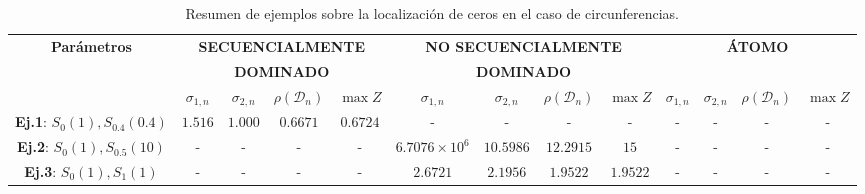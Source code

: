 \begin{table}
	\centering
	\small
	\caption{Resumen de ejemplos sobre la localización de ceros en el caso de circunferencias.}
	\begin{tabular}{|c|cccc|cccc|cccc|}
		\hline
		\multirow{3}{*}{\textbf{Parámetros}}     & \multicolumn{4}{c|}{\textbf{SECUENCIALMENTE}} & \multicolumn{4}{c|}{\textbf{NO SECUENCIALMENTE}} & \multicolumn{4}{c|}{\textbf{ÁTOMO}}                                                                                                                                                                     \\
		                                         & \multicolumn{4}{c|}{\textbf{DOMINADO}}        & \multicolumn{4}{c|}{\textbf{DOMINADO}}           & \multicolumn{4}{c|}{}                                                                                                                                                                                   \\
		\cline{2-13}
		                                         & $\sigma_{1,n}$                                & $\sigma_{2,n}$                                   & $\rho(\mathcal{D}_{n})$             & $\max Z$ & $\sigma_{1,n}$          & $\sigma_{2,n}$ & $\rho(\mathcal{D}_{n})$ & $\max Z$  & $\sigma_{1,n}$ & $\sigma_{2,n}$ & $\rho(\mathcal{D}_{n})$ & $\max Z$  \\
		\hline
		\textbf{Ej.1}: $S_{0}(1), S_{0.4}(0.4)$  & $1.516$                                       & $1.000$                                          & $0.6671$                            & $0.6724$ & -                       & -              & -                       & -         & -              & -              & -                       & -         \\
		\textbf{Ej.2}: $S_{0}(1), S_{0.5}(10)$   & -                                             & -                                                & -                                   & -        & $6.7076 \times 10^6$    & $10.5986$      & $12.2915$               & $15$      & -              & -              & -                       & -         \\
		\textbf{Ej.3}: $S_{0}(1), S_{1}(1)$      & -                                             & -                                                & -                                   & -        & $2.6721$                & $2.1956$       & $1.9522$                & $1.9522$  & -              & -              & -                       & -         \\

\end{tabular}
\end{table}

